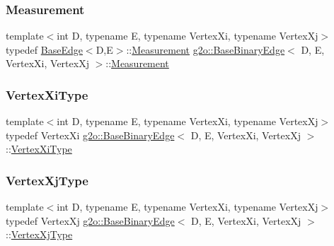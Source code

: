\subsubsection{\texorpdfstring{Measurement}{Measurement}}
{\footnotesize\ttfamily template$<$int D, typename E, typename Vertex\+Xi, typename Vertex\+Xj$>$ \\
typedef \mbox{\hyperlink{classg2o_1_1_base_edge}{Base\+Edge}}$<$D,E$>$\+::\mbox{\hyperlink{classg2o_1_1_base_binary_edge_ac1e9249e9906747a6669a9c90013944b}{Measurement}} \mbox{\hyperlink{classg2o_1_1_base_binary_edge}{g2o\+::\+Base\+Binary\+Edge}}$<$ D, E, Vertex\+Xi, Vertex\+Xj $>$\+::\mbox{\hyperlink{classg2o_1_1_base_binary_edge_ac1e9249e9906747a6669a9c90013944b}{Measurement}}}

\mbox{\label{classg2o_1_1_base_binary_edge_aa8e2b04b2c0c90adc48384d6d41063cc}} 
\subsubsection{\texorpdfstring{Vertex\+Xi\+Type}{VertexXiType}}
{\footnotesize\ttfamily template$<$int D, typename E, typename Vertex\+Xi, typename Vertex\+Xj$>$ \\
typedef Vertex\+Xi \mbox{\hyperlink{classg2o_1_1_base_binary_edge}{g2o\+::\+Base\+Binary\+Edge}}$<$ D, E, Vertex\+Xi, Vertex\+Xj $>$\+::\mbox{\hyperlink{classg2o_1_1_base_binary_edge_aa8e2b04b2c0c90adc48384d6d41063cc}{Vertex\+Xi\+Type}}}

\mbox{\label{classg2o_1_1_base_binary_edge_aa489ae37680c37d7b2c3c1a197f90de9}} 
\subsubsection{\texorpdfstring{Vertex\+Xj\+Type}{VertexXjType}}
{\footnotesize\ttfamily template$<$int D, typename E, typename Vertex\+Xi, typename Vertex\+Xj$>$ \\
typedef Vertex\+Xj \mbox{\hyperlink{classg2o_1_1_base_binary_edge}{g2o\+::\+Base\+Binary\+Edge}}$<$ D, E, Vertex\+Xi, Vertex\+Xj $>$\+::\mbox{\hyperlink{classg2o_1_1_base_binary_edge_aa489ae37680c37d7b2c3c1a197f90de9}{Vertex\+Xj\+Type}}}



